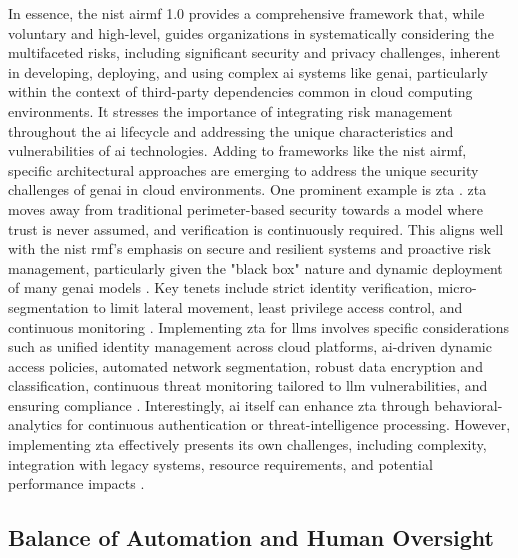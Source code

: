 In essence, the \gls{nist} \gls{airmf} 1.0 provides a comprehensive framework that, while voluntary and high-level, guides organizations in systematically considering the multifaceted risks, including significant security and privacy challenges, inherent in developing, deploying, and using complex \gls{ai} systems like \gls{genai}, particularly within the context of third-party dependencies common in cloud computing environments. It stresses the importance of integrating risk management throughout the \gls{ai} lifecycle and addressing the unique characteristics and vulnerabilities of \gls{ai} technologies.
Adding to frameworks like the \gls{nist} \gls{airmf}, specific architectural approaches are emerging to address the unique security challenges of \gls{genai} in cloud environments. One prominent example is \gls{zta} \cite{dash_zero-trust_2024}. \gls{zta} moves away from traditional perimeter-based security towards a model where trust is never assumed, and verification is continuously required\cite{dash_zero-trust_2024}. This aligns well with the \gls{nist} \gls{rmf}'s emphasis on secure and resilient systems and proactive risk management, particularly given the "black box" nature and dynamic deployment of many \gls{genai} models \cite{dash_zero-trust_2024, tabassi_artificial_2023}. Key tenets include strict identity verification, micro-segmentation to limit lateral movement, least privilege access control, and continuous monitoring \cite{dash_zero-trust_2024}. Implementing \gls{zta} for \glspl{llm} involves specific considerations such as unified identity management across cloud platforms, \gls{ai}-driven dynamic access policies, automated network segmentation, robust data encryption and classification, continuous threat monitoring tailored to \gls{llm} vulnerabilities, and ensuring compliance \cite{dash_zero-trust_2024}. Interestingly, \gls{ai} itself can enhance \gls{zta} through \gls{behavioral-analytics} for continuous authentication or \gls{threat-intelligence} processing\cite{dash_zero-trust_2024}. However, implementing \gls{zta} effectively presents its own challenges, including complexity, integration with legacy systems, resource requirements, and potential performance impacts \cite{dash_zero-trust_2024}.

\subsection{Balance of Automation and Human Oversight} %
\label{sec:Balance of Automation and Human Oversight}

